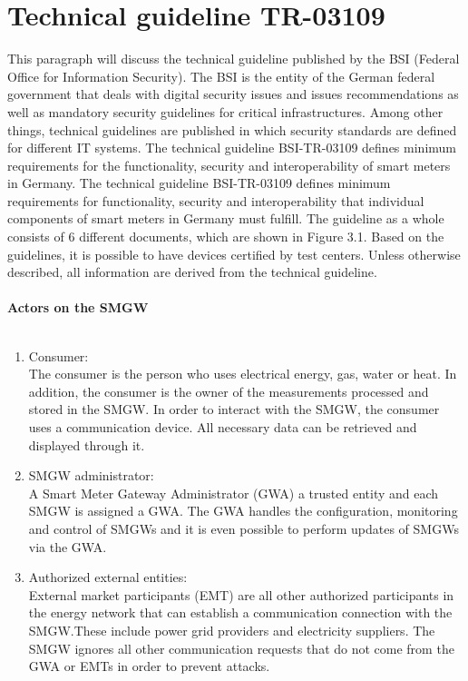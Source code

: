 \section{Technical guideline TR-03109}
This paragraph will discuss the technical guideline published by the BSI (Federal Office for Information Security). The BSI is the entity of the German federal government that deals with digital security issues and issues recommendations as well as mandatory security guidelines for critical infrastructures. Among other things, technical guidelines are published in which security standards are defined for different IT systems. The technical guideline BSI-TR-03109 defines minimum requirements for the functionality, security and interoperability of smart meters in Germany.  The technical guideline BSI-TR-03109 defines minimum requirements for functionality, security and interoperability that individual components of smart meters in Germany must fulfill. The guideline as a whole consists of 6 different documents, which are shown in Figure 3.1. Based on the guidelines, it is possible to have devices certified by test centers. Unless otherwise described, all information are derived from the technical guideline.\\
\\
\textbf{Actors on the SMGW}
\\
\\
\begin{enumerate}
\item Consumer: \\
The consumer is the person who uses electrical energy, gas, water
or heat. In addition, the consumer is the owner of the measurements processed and stored in the SMGW. In order to interact with the SMGW, the consumer uses a communication device. All necessary data can be retrieved and displayed through it.\\
\item SMGW administrator:\\
A Smart Meter Gateway Administrator (GWA) a trusted entity and each SMGW is assigned a GWA. The GWA handles the configuration, monitoring and control of SMGWs and it is even possible to perform updates of SMGWs via the GWA.\\
\item Authorized external entities:\\
External market participants (EMT) are all other authorized participants in the energy network that can establish a communication connection with the SMGW.These include power grid providers and electricity suppliers. The SMGW ignores all other communication requests that do not come from the GWA or EMTs in order to prevent attacks.\\
\end{enumerate}
